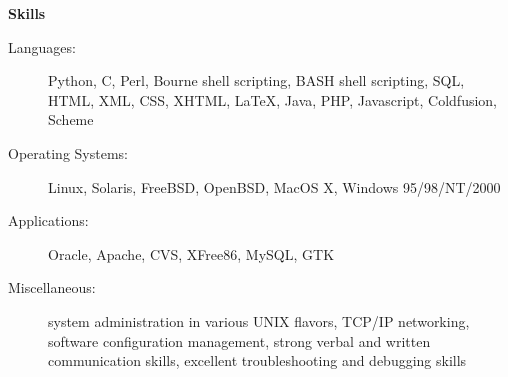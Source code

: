 \documentclass[11pt]{article}
\begin{document}
{\large \textbf{Skills}}

\begin{description}
\item[Languages:]
Python, C, Perl, Bourne shell scripting, BASH shell scripting, SQL, HTML, XML, CSS, XHTML, \LaTeX, Java, PHP, Javascript, Coldfusion, Scheme
\item[Operating Systems:]
Linux, Solaris, FreeBSD, OpenBSD, MacOS X, Windows 95/98/NT/2000
\item[Applications:]
Oracle, Apache, CVS, XFree86, MySQL, GTK
\item[Miscellaneous:]
system administration in various UNIX flavors, TCP/IP networking, software configuration management, strong verbal and written communication skills, excellent troubleshooting and debugging skills
\end{description}
\end{document}
